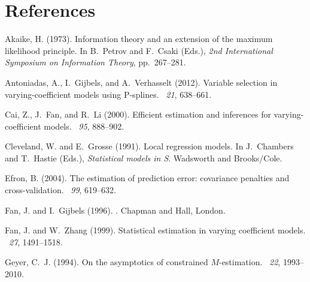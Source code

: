 \documentclass[authoryear,review, 12pt]{elsarticle}
\begin{document}
\section*{References}

\begin{thebibliography}{}

Akaike, H. (1973).
\newblock Information theory and an extension of the maximum likelihood
  principle.
\newblock In B.~Petrov and F.~Csaki (Eds.), {\em 2nd International Symposium on
  Information Theory}, pp.\  267--281.

Antoniadas, A., I.~Gijbels, and A.~Verhasselt (2012).
\newblock Variable selection in varying-coefficient models using {P}-splines.
~{\em 21},
  638--661.

Cai, Z., J.~Fan, and R.~Li (2000).
\newblock Efficient estimation and inferences for varying-coefficient models.
~{\em 95},
  888--902.

Cleveland, W. and E.~Grosse (1991).
\newblock Local regression models.
\newblock In J.~Chambers and T.~Hastie (Eds.), {\em Statistical models in S}.
  Wadsworth and Brooks/Cole.

Efron, B. (2004).
\newblock The estimation of prediction error: covariance penalties and
  cross-validation.
~{\em 99},
  619--632.

Fan, J. and I.~Gijbels (1996).
.
\newblock Chapman and Hall, London.

Fan, J. and W.~Zhang (1999).
\newblock Statistical estimation in varying coefficient models.
~{\em 27}, 1491--1518.

Geyer, C.~J. (1994).
\newblock On the asymptotics of constrained ${M}$-estimation.
~{\em 22}, 1993--2010.


\end{thebibliography}
\end{document}
